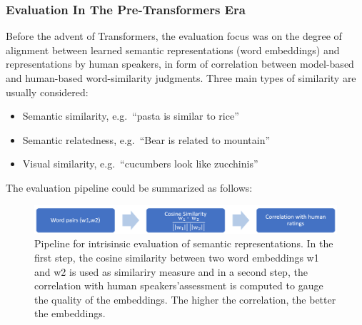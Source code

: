 \documentclass[
]{krantz}
\begin{document}
\hypertarget{evaluation-in-the-pre-transformers-era}{%
\subsubsection{Evaluation In The Pre-Transformers Era}\label{evaluation-in-the-pre-transformers-era}}

Before the advent of Transformers, the evaluation focus was on the degree of alignment between learned semantic representations (word embeddings) and representations by human speakers, in form of correlation between model-based and human-based word-similarity judgments. Three main types of similarity are usually considered:

\begin{itemize}
\item
  Semantic similarity, e.g.~``pasta is similar to rice''
\item
  Semantic relatedness, e.g.~``Bear is related to mountain''
\item
  Visual similarity, e.g.~``cucumbers look like zucchinis''
\end{itemize}

The evaluation pipeline could be summarized as follows:

\begin{figure}

{\centering \includegraphics[width=1\linewidth]{figures/02-03-img-support-text/img-eval01} 

}

\caption{Pipeline for intrisinsic evaluation of semantic representations. In the first step, the cosine similarity between two word embeddings w1 and w2 is used as similariry measure and in a second step, the correlation with human speakers'assessment is computed to gauge the quality of the embeddings. The higher the correlation, the better the embeddings.}\label{fig:img-eval01}
\end{figure}
\end{document}
